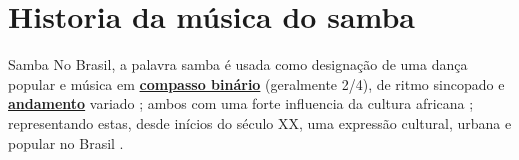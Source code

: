 
\chapter{Historia da música do samba}


\begin{tcbinformation}{Samba}
\label{ref:samba} 
No Brasil, a palavra samba  é usada como designação de uma dança popular  
e música  em \hyperref[subsec:compassobinario]{\textbf{compasso binário}} (geralmente 2/4), 
de ritmo sincopado e \hyperref[sec:Andamento]{\textbf{andamento}} 
variado \cite[pp. 290]{dourado2004dicionario} \cite[pp. 684]{marcondes1977enciclopediav2};
ambos com uma forte influencia da cultura africana \cite[pp. 290]{dourado2004dicionario};
representando estas, desde inícios do século XX, 
uma expressão cultural, urbana e popular no Brasil \cite[pp. 684]{marcondes1977enciclopediav2} \cite[pp. 290]{dourado2004dicionario}. 
\end{tcbinformation}

~

